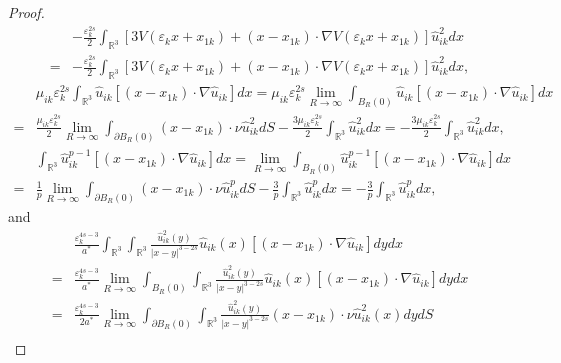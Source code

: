 \documentclass[10pt,a4paper]{amsart}
\begin{document}
\begin{proof}
\begin{equation}
\begin{split}
				&-\frac{\varepsilon_{k}^{2s}}{2}\int_{\mathbb{R}^{3}}\left[3V(\varepsilon_{k}x+x_{1k})+(x-x_{1k})\cdot\nabla V(\varepsilon_{k}x+x_{1k})\right] \hat{u}_{ik}^{2}dx\\
				=&-\frac{\varepsilon_{k}^{2s}}{2}\int_{\mathbb{R}^{3}}\left[3V(\varepsilon_{k}x+x_{1k})+(x-x_{1k})\cdot\nabla V(\varepsilon_{k}x+x_{1k})\right] \hat{u}_{ik}^{2}dx,
			\end{split}
		\end{equation}
		\begin{equation}\label{equ4-32}
			\begin{split}
				&\mu_{ik}\varepsilon_{k}^{2s}\int_{\mathbb{R}^{3}}\hat{u}_{ik}[(x-x_{1k})\cdot\nabla\hat{u}_{ik}]dx=\mu_{ik}\varepsilon_{k}^{2s}\lim_{R\rightarrow\infty}\int_{ B_{R}(0)}\hat{u}_{ik}[(x-x_{1k})\cdot\nabla\hat{u}_{ik}]dx\\
				=&\frac{\mu_{ik}\varepsilon_{k}^{2s}}{2}\lim_{R\rightarrow\infty}\int_{\partial B_{R}(0)}(x-x_{1k})\cdot\nu\hat{u}_{ik}^{2}dS-\frac{3\mu_{ik}\varepsilon_{k}^{2s}}{2}\int_{\mathbb{R}^{3}}\hat{u}_{ik}^{2}dx=-\frac{3\mu_{ik}\varepsilon_{k}^{2s}}{2}\int_{\mathbb{R}^{3}}\hat{u}_{ik}^{2}dx,
			\end{split}
		\end{equation}
		\begin{equation}\label{equ4-33}
			\begin{split}
				&\int_{\mathbb{R}^{3}}\hat{u}_{ik}^{p-1}[(x-x_{1k})\cdot\nabla\hat{u}_{ik}]dx=\lim_{R\rightarrow\infty}\int_{ B_{R}(0)}\hat{u}_{ik}^{p-1}[(x-x_{1k})\cdot\nabla\hat{u}_{ik}]dx\\
				=&\frac{1}{p}\lim_{R\rightarrow\infty}\int_{\partial B_{R}(0)}(x-x_{1k})\cdot\nu\hat{u}_{ik}^{p}dS-\frac{3}{p}\int_{\mathbb{R}^{3}}\hat{u}_{ik}^{p}dx=-\frac{3}{p}\int_{\mathbb{R}^{3}}\hat{u}_{ik}^{p}dx,
			\end{split}
		\end{equation}
		and
		\begin{equation}\label{equ4-34}
			\begin{split}
				&\frac{\varepsilon_{k}^{4s-3}}{a^{\ast}}\int_{\mathbb{R}^{3}}\int_{\mathbb{R}^{3}}\frac{\hat{u}_{ik}^{2}(y)}{|x-y|^{3-2s}}\hat{u}_{ik}(x)[(x-x_{1k})\cdot\nabla\hat{u}_{ik}]dydx\\
				=&\frac{\varepsilon_{k}^{4s-3}}{a^{\ast}}\lim_{R\rightarrow\infty}\int_{ B_{R}(0)}\int_{\mathbb{R}^{3}}\frac{\hat{u}_{ik}^{2}(y)}{|x-y|^{3-2s}}\hat{u}_{ik}(x)[(x-x_{1k})\cdot\nabla\hat{u}_{ik}]dydx\\
				=&\frac{\varepsilon_{k}^{4s-3}}{2a^{\ast}}\lim_{ R\rightarrow\infty}\int_{ \partial B_{R}(0)}\int_{\mathbb{R}^{3}}\frac{\hat{u}_{ik}^{2}(y)}{|x-y|^{3-2s}}(x-x_{1k})\cdot\nu\hat{u}_{ik}^{2}(x)dydS\\

\end{split}
\end{equation}
\end{proof}
\end{document}
